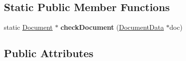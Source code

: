 \subsection*{Static Public Member Functions}
\begin{DoxyCompactItemize}
\item 
\mbox{\label{class_poppler_1_1_document_data_a0abe898eb6142fbed45615f8dc0a23ab}} 
static \hyperlink{class_poppler_1_1_document}{Document} $\ast$ {\bfseries check\+Document} (\hyperlink{class_poppler_1_1_document_data}{Document\+Data} $\ast$doc)
\end{DoxyCompactItemize}
\subsection*{Public Attributes}
